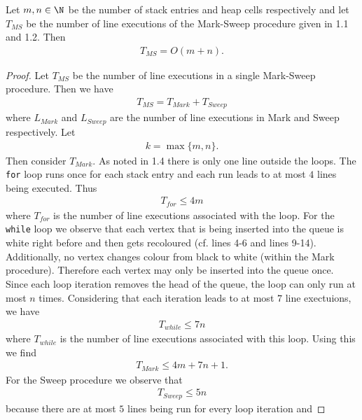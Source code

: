 \documentclass{article}
\begin{document}
\begin{claim}
    Let $m,n\in\N$ be the number of stack entries and heap cells respectively and
    let $T_{MS}$ be the number of line executions of the Mark-Sweep procedure
    given in 1.1 and 1.2. Then
    \begin{align*}
        T_{MS} = O(m+n).
    \end{align*} 
\end{claim}
\begin{proof}
    Let $T_{MS}$ be the number of line executions in a single Mark-Sweep procedure.
    Then we have
    \begin{align}
        \label{forlms}
        T_{MS} = T_{Mark} + T_{Sweep}
    \end{align}
    where $L_{Mark}$ and $L_{Sweep}$ are the number of line executions in Mark and
    Sweep respectively. Let
    \begin{align*}
        k = \max\{m,n\}.    
    \end{align*}
    Then consider $T_{Mark}$. As noted in 
    1.4 there is only one line outside the loops. The \texttt{for} loop runs once for each
    stack entry and each run leads to at most $4$ lines being executed. Thus
    \begin{align*}
        T_{for} \leq 4m
    \end{align*}
    where $T_{for}$ is the number of line executions associated with the loop. For
    the \texttt{while} loop we observe that each vertex that is being inserted into the
    queue is white right before and then gets recoloured (cf. lines 4-6 and lines 9-14).
    Additionally, no vertex changes colour from black to white (within the Mark procedure).
    Therefore each vertex may only be inserted into the queue once. Since each loop iteration 
    removes the head of the queue, the loop can only run at most $n$ times.
    Considering that each iteration leads to at most $7$ line exectuions, we have
    \begin{align*}
        T_{while} \leq 7n
    \end{align*}
    where $T_{while}$ is the number of line executions associated with this loop.
    Using this we find
    \begin{align*}
        T_{Mark} \leq 4m + 7n + 1.
    \end{align*}
     For the Sweep procedure we observe that
    \begin{align*}
        T_{Sweep} \leq 5n
    \end{align*}
    because there are at most $5$ lines being run for every loop iteration and

\end{proof}
\end{document}
